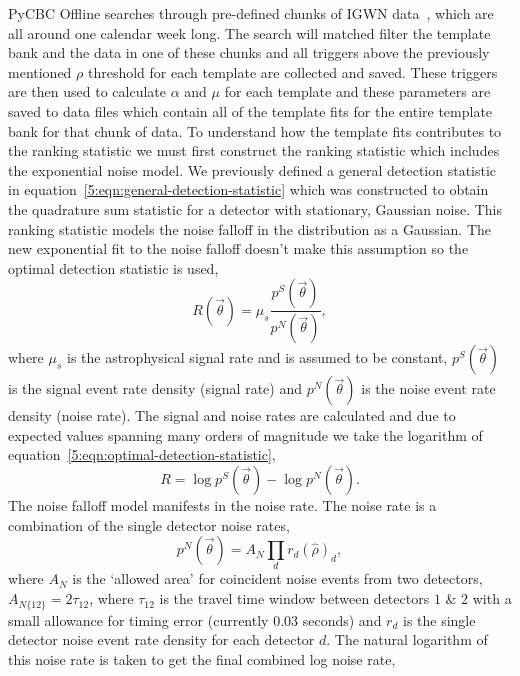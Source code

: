 PyCBC Offline searches through pre-defined chunks of IGWN data~\cite{gwtc3:2023}, which are all around one calendar week long. The search will matched filter the template bank and the data in one of these chunks and all triggers above the previously mentioned $\rho$ threshold for each template are collected and saved. These triggers are then used to calculate $\alpha$ and $\mu$ for each template and these parameters are saved to data files which contain all of the template fits for the entire template bank for that chunk of data.
%
% 
To understand how the template fits contributes to the ranking statistic we must first construct the ranking statistic which includes the exponential noise model. We previously defined a general detection statistic in equation~\ref{5:eqn:general-detection-statistic} which was constructed to obtain the quadrature sum statistic for a detector with stationary, Gaussian noise. This ranking statistic models the noise falloff in the distribution as a Gaussian. The new exponential fit to the noise falloff doesn't make this assumption so the optimal detection statistic is used,
%
\begin{equation}
    R(\Vec{\theta}) = \mu_{s} \frac{p^{S}(\Vec{\theta})}{p^{N}(\Vec{\theta})} ,
    \label{5:eqn:optimal-detection-statistic}
\end{equation}
where $\mu_{s}$ is the astrophysical signal rate and is assumed to be constant, $p^{S}(\Vec{\theta})$ is the signal event rate density (signal rate) and $p^{N}(\Vec{\theta})$ is the noise event rate density (noise rate). The signal and noise rates are calculated and due to expected values spanning many orders of magnitude we take the logarithm of equation~\ref{5:eqn:optimal-detection-statistic},
%
\begin{equation}
    R = \log p^{S}(\Vec{\theta}) - \log p^{N}(\Vec{\theta}).
    \label{5:eqn:signal-minus-noise-rate}
\end{equation}
The noise falloff model manifests in the noise rate. The noise rate is a combination of the single detector noise rates,
%
\begin{equation}
    p^{N}(\Vec{\theta}) = A_{N} \prod_{d} r_{d}(\hat{\rho})_{d} ,
\label{5:eqn:comb-noise-rate}
\end{equation}
%
where $A_{N}$ is the `allowed area' for coincident noise events from two detectors, $A_{N\{12\}} = 2\tau_{12}$, where $\tau_{12}$ is the \gwadj travel time window between detectors $1$ \& $2$ with a small allowance for timing error (currently $0.03$ seconds) and $r_{d}$ is the single detector noise event rate density for each detector $d$. The natural logarithm of this noise rate is taken to get the final combined log noise rate,
